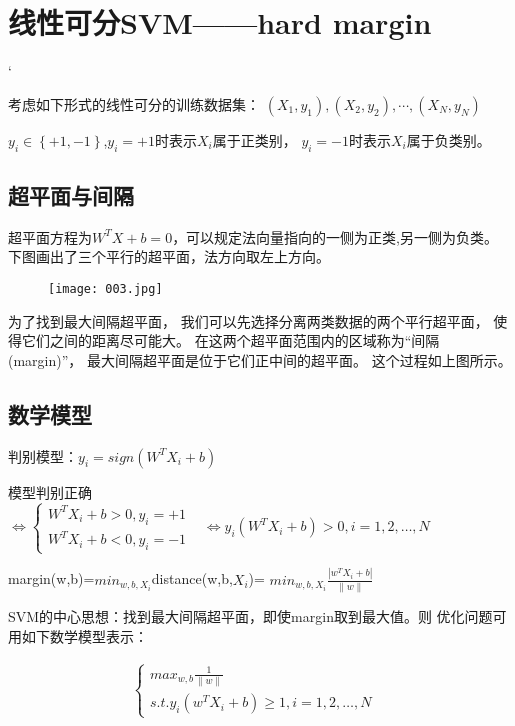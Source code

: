 \documentclass[12pt]{article}
\begin{document}
\section{线性可分SVM——hard margin}‘

考虑如下形式的线性可分的训练数据集：
$(X_1,y_1),(X_2,y_2),\cdots ,(X_N,y_N)$


$y_i\in \left\{+1,-1\right\} $,$y_i=+1$时表示$X_i$属于正类别，
$y_i=-1$时表示$X_i$属于负类别。

\subsection{超平面与间隔}

超平面方程为$W^TX+b=0$，可以规定法向量指向的一侧为正类,另一侧为负类。
下图画出了三个平行的超平面，法方向取左上方向。
\begin{figure}[htbp]
	\centering
	\texttt{[image: 003.jpg]}
\end{figure}

为了找到最大间隔超平面，
我们可以先选择分离两类数据的两个平行超平面，
使得它们之间的距离尽可能大。
在这两个超平面范围内的区域称为“间隔(margin)”，
最大间隔超平面是位于它们正中间的超平面。
这个过程如上图所示。

\subsection{数学模型}
判别模型：$y_i=sign(W^TX_i+b)$

模型判别正确$\Leftrightarrow \left\{
	\begin{array}{lr}
	W^TX_i+b>0,y_i=+1 &  \\
	W^TX_i+b<0,y_i=-1 &  
	\end{array}
	\right.\Leftrightarrow y_i(W^TX_i+b)>0,i=1,2,\ldots ,N$

margin(w,b)=$min_{w,b,X_i}$distance(w,b,$X_i$)=
$min_{w,b,X_i}\frac{\left\lvert w^TX_i+b\right\rvert }{\left\lVert w\right\rVert }$

SVM的中心思想：找到最大间隔超平面，即使margin取到最大值。则
优化问题可用如下数学模型表示：

\begin{align}
	\left\{
	\begin{array}{lr}
	max_{w,b}\frac{1}{\left\lVert w\right\rVert } &  \\
	s.t. y_i(w^TX_i+b)\geq 1,i=1,2,\ldots ,N &  
	\end{array}
	\right.
\end{align}
\end{document}
